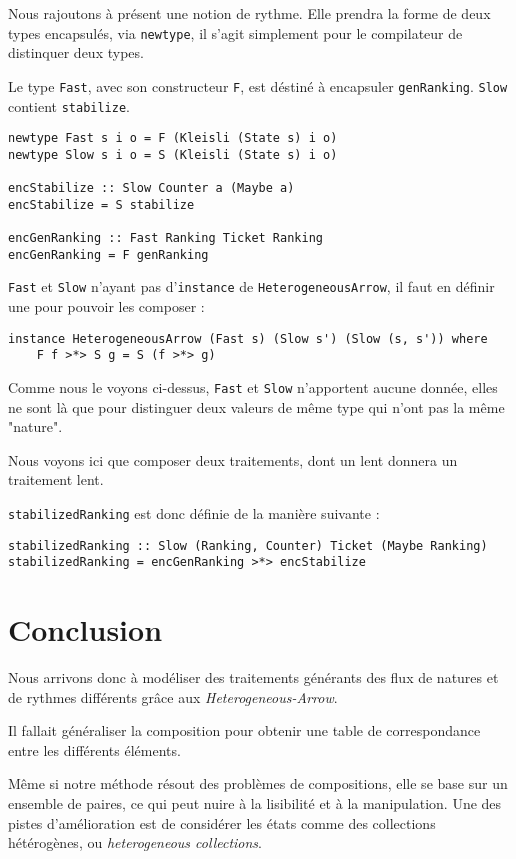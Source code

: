 \documentclass{llncs}
\newcommand{\SAp}{\emph{Heterogeneous-Arrow}. }
\newcommand{\HAv}{\lstinline{HeterogeneousArrow}, }
\begin{document}
Nous rajoutons à présent une notion de rythme.
Elle prendra la forme de deux types encapsulés, via \lstinline{newtype}, il s'agit
simplement pour le compilateur de distinquer deux types.

Le type \lstinline{Fast}, avec son constructeur \lstinline{F}, est déstiné à
encapsuler \lstinline{genRanking}.
\lstinline{Slow} contient \lstinline{stabilize}.
\begin{lstlisting}
newtype Fast s i o = F (Kleisli (State s) i o)
newtype Slow s i o = S (Kleisli (State s) i o)

encStabilize :: Slow Counter a (Maybe a)
encStabilize = S stabilize

encGenRanking :: Fast Ranking Ticket Ranking
encGenRanking = F genRanking
\end{lstlisting}

\lstinline{Fast} et \lstinline{Slow} n'ayant pas d'\lstinline{instance} de \HAv
il faut en définir une pour pouvoir les composer :
\begin{lstlisting}
instance HeterogeneousArrow (Fast s) (Slow s') (Slow (s, s')) where
    F f >*> S g = S (f >*> g)
\end{lstlisting}
Comme nous le voyons ci-dessus, \lstinline{Fast} et \lstinline{Slow} n'apportent
aucune donnée, elles ne sont là que pour distinguer deux valeurs de même type qui
n'ont pas la même "nature".

Nous voyons ici que composer deux traitements, dont un lent donnera un traitement
lent.

\lstinline{stabilizedRanking} est donc définie de la manière suivante :
\begin{lstlisting}
stabilizedRanking :: Slow (Ranking, Counter) Ticket (Maybe Ranking)
stabilizedRanking = encGenRanking >*> encStabilize
\end{lstlisting}

\section{Conclusion}
Nous arrivons donc à modéliser des traitements générants des flux de natures et de
rythmes différents grâce aux \SAp

Il fallait généraliser la composition pour obtenir une table de correspondance entre
les différents éléments.

Même si notre méthode résout des problèmes de compositions, elle se base sur un
ensemble de paires, ce qui peut nuire à la lisibilité et à la manipulation.
Une des pistes d'amélioration est de considérer les états comme des collections
hétérogènes, ou \emph{heterogeneous collections}.
\end{document}
